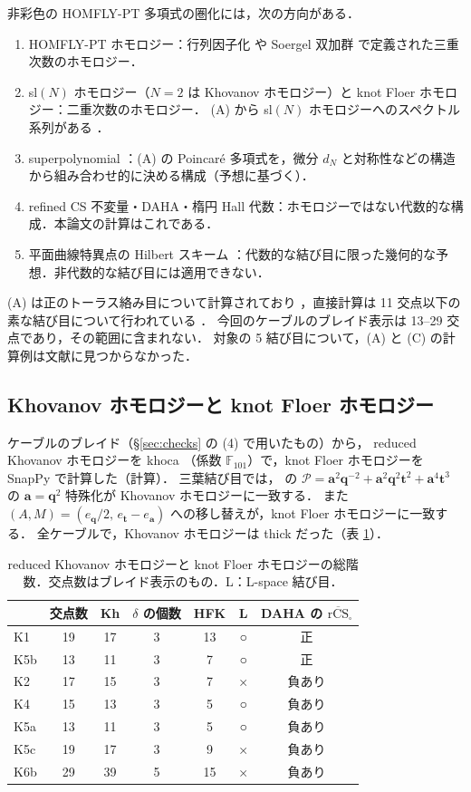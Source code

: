 \documentclass[11pt,a4paper]{ltjsarticle}
\theoremstyle{definition}
\theoremstyle{remark}
\newcommand{\rCS}{\overline{\mathrm{rCS}}}
\newcommand{\ba}{\mathbf{a}}
\newcommand{\bq}{\mathbf{q}}
\newcommand{\bt}{\mathbf{t}}
\begin{document}
非彩色の HOMFLY-PT 多項式の圏化には，次の方向がある．
\begin{enumerate}
\item[(A)] HOMFLY-PT ホモロジー：行列因子化 \cite{KR2} や Soergel 双加群 \cite{Kh07} で定義された三重次数のホモロジー．
\item[(B)] sl$(N)$ ホモロジー（$N=2$ は Khovanov ホモロジー）と knot Floer ホモロジー：二重次数のホモロジー．
  (A) から sl$(N)$ ホモロジーへのスペクトル系列がある \cite{Ras}．
\item[(C)] superpolynomial \cite{DGR}：(A) の Poincaré 多項式を，微分 $d_N$ と対称性などの構造から組み合わせ的に決める構成（予想に基づく）．
\item[(D)] refined CS 不変量・DAHA・楕円 Hall 代数：ホモロジーではない代数的な構成．本論文の計算はこれである．
\item[(E)] 平面曲線特異点の Hilbert スキーム \cite{ORS}：代数的な結び目に限った幾何的な予想．非代数的な結び目には適用できない．
\end{enumerate}
(A) は正のトーラス絡み目について計算されており \cite{HM}，直接計算は 11 交点以下の素な結び目について行われている \cite{NS}．
今回のケーブルのブレイド表示は 13--29 交点であり，その範囲に含まれない．
対象の 5 結び目について，(A) と (C) の計算例は文献に見つからなかった．

\subsection{Khovanov ホモロジーと knot Floer ホモロジー}

ケーブルのブレイド（\S\ref{sec:checks} の (4) で用いたもの）から，
reduced Khovanov ホモロジーを khoca \cite{khoca}（係数 $\mathbb{F}_{101}$）で，knot Floer ホモロジーを SnapPy \cite{snappy} で計算した（計算）．
三葉結び目では，\cite{DGR} の $\mathcal{P}=\ba^2\bq^{-2}+\ba^2\bq^2\bt^2+\ba^4\bt^3$ の $\ba=\bq^2$ 特殊化が Khovanov ホモロジーに一致する．
また $(A,M)=(e_\bq/2,\,e_\bt-e_\ba)$ への移し替えが，knot Floer ホモロジーに一致する．
全ケーブルで，Khovanov ホモロジーは thick だった（表 \ref{tab:homology}）．

\begin{table}[h]
\centering
\caption{reduced Khovanov ホモロジーと knot Floer ホモロジーの総階数．交点数はブレイド表示のもの．L：L-space 結び目．}\label{tab:homology}
\small
\begin{tabular}{lcccccc}
\toprule
 & 交点数 & Kh & $\delta$ の個数 & HFK & L & DAHA の $\rCS_\square$ \\
\midrule
K1 & 19 & 17 & 3 & 13 & ○ & 正 \\
K5b & 13 & 11 & 3 & 7 & ○ & 正 \\
K2 & 17 & 15 & 3 & 7 & × & 負あり \\
K4 & 15 & 13 & 3 & 5 & ○ & 負あり \\
K5a & 13 & 11 & 3 & 5 & ○ & 負あり \\
K5c & 19 & 17 & 3 & 9 & × & 負あり \\
K6b & 29 & 39 & 5 & 15 & × & 負あり \\
\bottomrule
\end{tabular}
\end{table}
\end{document}
